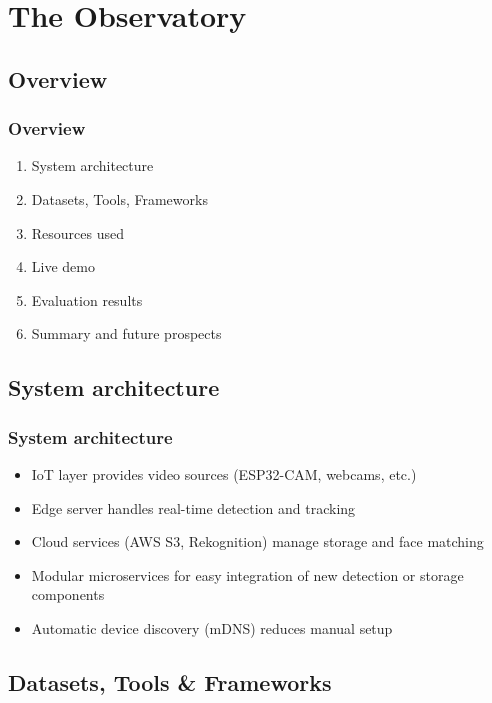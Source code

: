 \documentclass[11pt,t,usepdftitle=false,aspectratio=169]{beamer}
\begin{document}
\section{The Observatory}

\subsection{Overview}

\begin{frame}
\frametitle{Overview}

  
  \bigskip
  \begin{enumerate}
  	\item {System architecture}
  	\item Datasets, Tools, Frameworks
  	\item Resources used
  	\item {Live demo}
  	\item {Evaluation results}
  	\item Summary and future prospects
  \end{enumerate}

\end{frame}

\subsection{System architecture}

\begin{frame}
\frametitle{System architecture}
\begin{itemize}
	\item IoT layer provides video sources (ESP32-CAM, webcams, etc.)
	\item Edge server handles real-time detection and tracking
	\item Cloud services (AWS S3, Rekognition) manage storage and face matching
	\item Modular microservices for easy integration of new detection or storage components
	\item Automatic device discovery (mDNS) reduces manual setup
\end{itemize}
\end{frame}

\subsection{Datasets, Tools \& Frameworks}
\end{document}
